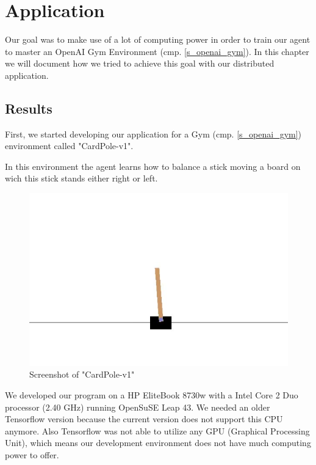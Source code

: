 \section{Application}

Our goal was to make use of a lot of computing power in
order to train our agent to master an OpenAI Gym
Environment (cmp. \ref{s_openai_gym}). In this chapter we
will document how we tried to achieve this goal with our
distributed application.




\newpage



\subsection{Results}

First, we started developing our application for a Gym
(cmp. \ref{s_openai_gym}) environment called "CardPole-v1".

In this environment the agent learns how to balance a stick
moving a board on wich this stick stands either right or
left.

\begin{figure}[H]
  \centering
  \includegraphics[width=\textwidth/2]
  {diagrams/cardpole.jpg}
  \caption{Screenshot of "CardPole-v1"}
\end{figure}

We developed our program on a HP EliteBook 8730w with a
Intel Core 2 Duo processor (2.40 GHz) running OpenSuSE
Leap 43. We needed an older Tensorflow version because the
current version does not support this CPU anymore. Also
Tensorflow was not able to utilize any GPU (Graphical
Processing Unit), which means our development environment
does not have much computing power to offer.

